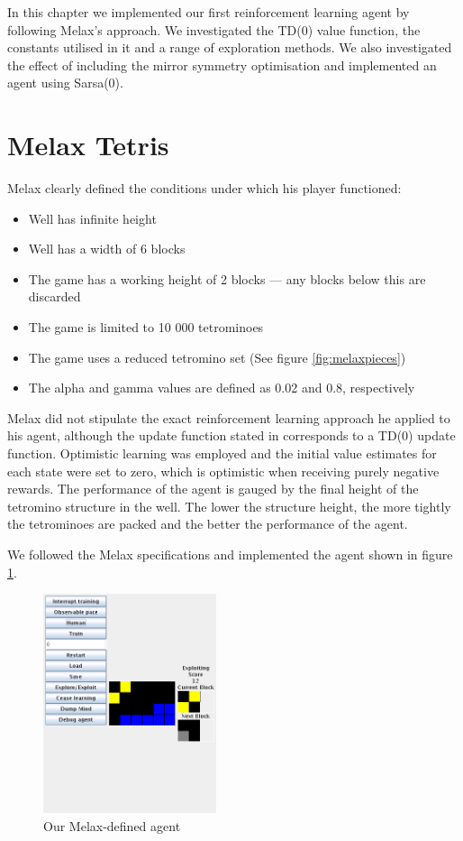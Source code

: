 \documentclass{rucsthesis}
\begin{document}
In this chapter we implemented our first reinforcement learning agent by following Melax's approach. We investigated the TD(0) value function, the constants utilised in it and a range of exploration methods. We also investigated the effect of including the mirror symmetry optimisation and implemented an agent using Sarsa(0).

\section{Melax Tetris \label{melaxchapt}}

Melax clearly defined the conditions under which his player functioned:

\begin{itemize}
\item{Well has infinite height}
\item{Well has a width of 6 blocks}
\item{The game has a working height of 2 blocks --- any blocks below this are discarded}
\item{The game is limited to 10 000 tetrominoes}
\item{The game uses a reduced tetromino set (See figure \ref{fig:melaxpieces})}
\item{The alpha and gamma values are defined as 0.02 and 0.8, respectively}
\end{itemize}

Melax did not stipulate the exact reinforcement learning approach he applied to his agent, although the update function stated in \cite{melaxtetris} corresponds to a TD(0) update function. Optimistic learning was employed and the initial value estimates for each state were set to zero, which is optimistic when receiving purely negative rewards. The performance of the agent is gauged by the final height of the tetromino structure in the well. The lower the structure height, the more tightly the tetrominoes are packed and the better the performance of the agent.

We followed the Melax specifications and implemented the agent shown in figure \ref{fig:mymelax}.

\begin{figure}[h]
\centering
\includegraphics[width=2in]{mymelax.png}
\caption{Our Melax-defined agent}
\label{fig:mymelax}
\end{figure}
\end{document}
